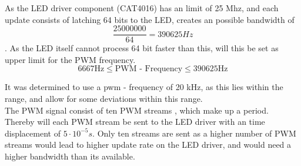 As the LED driver component (CAT4016) has an limit of 25 Mhz, and each update consists of latching  64 bits to the LED,  creates an possible bandwidth of $$\frac{25000000}{64} =  390625 Hz$$. As the LED itself cannot process 64 bit faster than this, will this be set as upper limit for the PWM frequency.    
$$6667 \text{Hz}  \leq \text{PWM - Frequency}  \leq 390625 \text{Hz}  $$

It was determined to use a pwm - frequency of 20 kHz, as this lies within the range, and allow for some deviations within this range.  \\

The PWM signal consist of ten PWM streams , which make up a period. Thereby will each PWM stream be sent to the LED driver with an time displacement of $5 \cdot 10^{-5} s$.   Only ten streams are sent as a higher number of PWM streams would lead to higher update rate on the LED driver, and would need a higher bandwidth than its available.  




